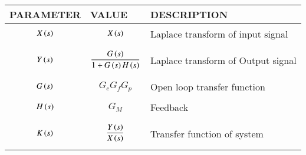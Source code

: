 \begin{tabular}{|p{2cm}|p{2cm}|p{4cm}|}
    \hline
    PARAMETER & VALUE & DESCRIPTION   \\ \hline
    $$X\left(s\right)$$ & $$X\left(s\right)$$ & Laplace transform of input signal  \\ \hline
    $$Y\left(s\right)$$ & $$\frac{G\left(s\right)}{1+G\left(s\right)H\left(s\right)}$$ & Laplace transform of Output signal  \\ \hline
    $$G\left(s\right)$$ & $$G_c G_f G_p$$ & Open loop transfer function    \\ \hline
    $$H\left(s\right)$$ & $$G_M$$ & Feedback  \\ \hline
    $$K\left(s\right)$$ & $$\frac{Y\left(s\right)}{X\left(s\right)}$$ & Transfer function of system   \\ \hline
    \end{tabular}
